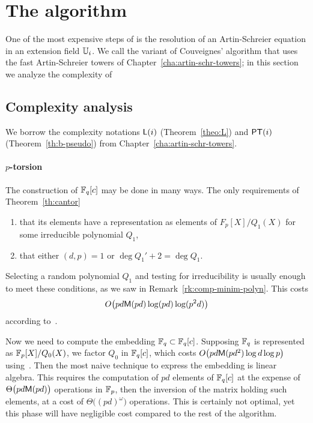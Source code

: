 

\section{The algorithm }
\label{sec:C2-AS}

One of the most expensive steps of \ctwo{} is the resolution of an
Artin-Schreier equation in an extension field $\mathbb{U}_i$. We call \ctwoas{}
the variant of Couveignes' algorithm that uses the fast Artin-Schreier
towers of Chapter~\ref{cha:artin-schr-towers}; in this section we
analyze the complexity of \ctwoas{}

\subsection{Complexity analysis}
\label{sec:C2-AS:complexity}
We borrow the complexity notations $\mathsf{L}(i)$ (Theorem~\ref{theo:L})
and $\mathsf{PT}(i)$ (Theorem~\ref{th:b-pseudo}) from
Chapter~\ref{cha:artin-schr-towers}.

\paragraph{$p$-torsion}
The construction of $\mathbb{F}_q[c]$ may be done in many ways. The only
requirements of Theorem~\ref{th:cantor}
\begin{enumerate}
\item that its elements have a representation as elements of
  $F_p[X]/Q_1(X)$ for some irreducible polynomial $Q_1$,
\item that either $(d,p)=1$ or $\deg Q_1' + 2 = \deg Q_1$.
\end{enumerate}
Selecting a random polynomial $Q_1$ and testing for irreducibility is
usually enough to meet these conditions, as we saw in
Remark~\ref{rk:comp-minim-polyn}.  This costs
\[O\bigl(pd\mathsf{M}(pd)\log(pd)\log(p^2d)\bigr)\] 
according to~\cite[Th.  14.42]{vzGG}.

Now we need to compute the embedding $\mathbb{F}_q\subset\mathbb{F}_q[c]$. Supposing
$\mathbb{F}_q$ is represented as $\mathbb{F}_p[X]/Q_0(X)$, we factor $Q_0$ in
$\mathbb{F}_q[c]$, which costs $O\bigl(pd\mathsf{M}(pd^2)\log d\log p\bigr)$
using~\cite[Coro. 14.16]{vzGG}. Then the most naive technique to
express the embedding is linear algebra. This requires the computation
of $pd$ elements of $\mathbb{F}_q[c]$ at the expense of
$\Theta\bigl(pd\mathsf{M}(pd)\bigr)$ operations in $\mathbb{F}_p$, then the
inversion of the matrix holding such elements, at a cost of
$\Theta\bigl((pd)^\omega\bigr)$ operations. This is certainly not
optimal, yet this phase will have negligible cost compared to the rest
of the algorithm.

